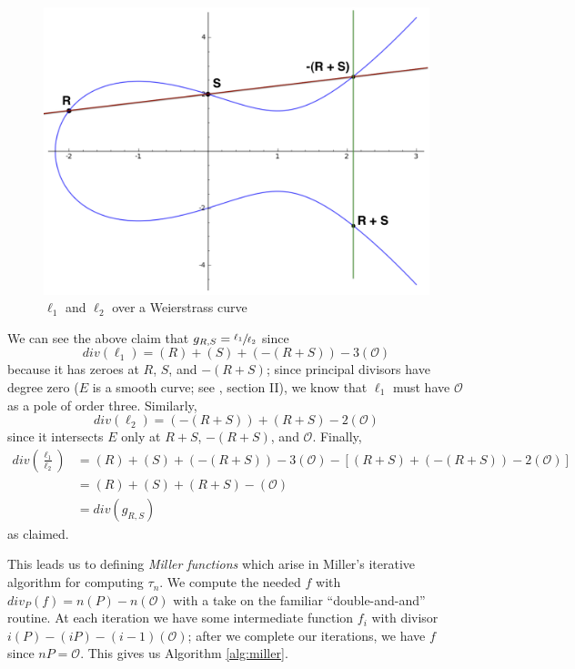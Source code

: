 \begin{figure}[htbp]
  \centering
  \includegraphics[scale=0.5]{figures/w_ells.png}
  \caption{$\ell_1$ and $\ell_2$ over a Weierstrass curve}
  \label{fig:w_ells}
\end{figure}

We can see the above claim that $g_{R, S} = \sfrac{\ell_1}{\ell_2}$ since
\[
div(\ell_1) = (R) + (S) + (-(R + S)) - 3(\mathcal{O})
\]
    because it has zeroes at $R$, $S$, and $-(R + S)$; since principal divisors
    have degree zero ($E$ is a smooth curve; see
    \cite{silverman2009arithmetic}, section II), we know that $\ell_1$ must
    have $\mathcal{O}$ as a pole of order three.
Similarly,
\[
div(\ell_2) = (-(R + S)) + (R + S) - 2(\mathcal{O})
\]
    since it intersects $E$ only at $R + S$, $-(R + S)$, and $\mathcal{O}$.
Finally,
\begin{align*}
div\left(\frac{\ell_1}{\ell_2}\right)
    &=  (R) + (S) + (-(R + S)) - 3(\mathcal{O}) -
            [(R + S) + (-(R + S)) - 2(\mathcal{O})]\\
    &=  (R) + (S) + (R + S) - (\mathcal{O})\\
    &=  div(g_{R, S})
\end{align*}
    as claimed.

This leads us to defining \textit{Miller functions} which arise in Miller's
    iterative algorithm for computing $\tau_n$.
We compute the needed $f$ with $div_P(f) = n(P) - n(\mathcal{O})$ with a take
    on the familiar ``double-and-and'' routine.
At each iteration we have some intermediate function $f_i$ with divisor $i(P) -
    (iP) - (i - 1)(\mathcal{O})$; after we complete our iterations, we have $f$
    since $nP = \mathcal{O}$.
This gives us Algorithm \ref{alg:miller}.


